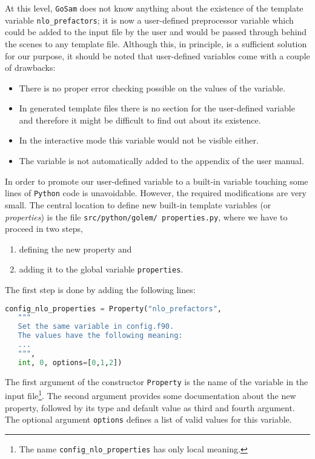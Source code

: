 \documentclass[11pt,a4paper]{refrep}
\newcommand{\golem}{{\tt GoSam}\xspace}
\newcommand{\python}{{\tt Python}\xspace}
\begin{document}
At this level, \golem{} does not know anything about the existence of
the template variable \texttt{nlo\_prefactors}; it is now a
user-defined preprocessor variable which could be added to the input
file by the user and would be passed through behind the scenes to any
template file.
Although this, in principle, is a sufficient solution for our purpose,
it should be noted that user-defined variables come with a couple of
drawbacks:
\begin{itemize}
\item There is no proper error checking possible on the values of
      the variable.
\item In generated template files there is no section for the
      user-defined variable and therefore it might be difficult
      to find out about its existence.
\item In the interactive mode this variable would not be visible
      either.
\item The variable is not automatically added to the appendix of
      the user manual.
\end{itemize}

In order to promote our user-defined variable to a built-in variable
touching some lines of \python{} code is unavoidable. However, the
required modifications are very small. The central location to define
new built-in template variables (or \emph{properties}) is the file
\texttt{src/\hspace{0pt}python/\hspace{0pt}golem/\hspace{0pt}%
properties.py}, where we have to proceed in two steps,
\begin{enumerate}
\item defining the new property and
\item adding it to the global variable \texttt{properties}.
\end{enumerate}

The first step is done by adding the following lines:
\begin{lstlisting}[language=Python]
config_nlo_properties = Property("nlo_prefactors",
   """
   Set the same variable in config.f90.
   The values have the following meaning:
   ...
   """,
   int, 0, options=[0,1,2])
\end{lstlisting}
The first argument of the constructor \texttt{Property}
is the name of the variable in the input file\footnote{%
The name \texttt{config\_nlo\_properties} has only local meaning.}.
The second argument provides some documentation about the new
property, followed by its type and default value as third and fourth
argument. The optional argument \texttt{options} defines a list of
valid values for this variable.
\end{document}
